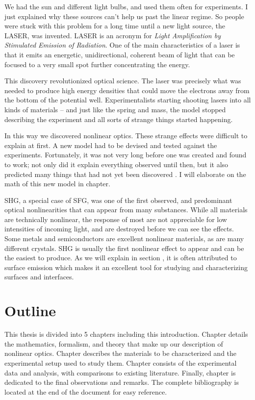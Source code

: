 We had the sun and different light bulbs, and used them often for experiments. I just explained why these sources can't help us past the linear regime. So people were stuck with this problem for a long time until a new light source, the LASER, was invented. LASER is an acronym for \emph{Light Amplification by Stimulated Emission of Radiation}. One of the main characteristics of a laser is that it emits an energetic, unidirectional, coherent beam of light that can be focused to a very small spot further concentrating the energy.

This discovery revolutionized optical science. The laser was precisely what was needed to produce high energy densities that could move the electrons away from the bottom of the potential well. Experimentalists starting shooting lasers into all kinds of materials -- and just like the spring and mass, the model stopped describing the experiment and all sorts of strange things started happening.

In this way we discovered nonlinear optics. These strange effects were difficult to explain at first. A new model had to be devised and tested against the experiments. Fortunately, it was not very long before one was created and found to work; not only did it explain everything observed until then, but it also predicted many things that had not yet been discovered \cite{boyd2003nonlinear, diels2006ultrashort, shen1984principles}. I will elaborate on the math of this new model in chapter.

SHG, a special case of SFG, was one of the first observed, and predominant optical nonlinearities that can appear from many substances. While all materials are technically nonlinear, the response of most are not appreciable for low intensities of incoming light, and are destroyed before we can see the effects. Some metals and semiconductors are excellent nonlinear materials, as are many different crystals. SHG is usually the first nonlinear effect to appear and can be the easiest to produce. As we will explain in section , it is often attributed to surface emission which makes it an excellent tool for studying and characterizing surfaces and interfaces.

\section{Outline}
This thesis is divided into 5 chapters including this introduction. Chapter  details the mathematics, formalism, and theory that make up our description of nonlinear optics. Chapter describes the materials to be characterized and the experimental setup used to study them. Chapter consists of the experimental data and analysis, with comparisons to existing literature. Finally, chapter  is dedicated to the final observations and remarks. The complete bibliography is located at the end of the document for easy reference.


